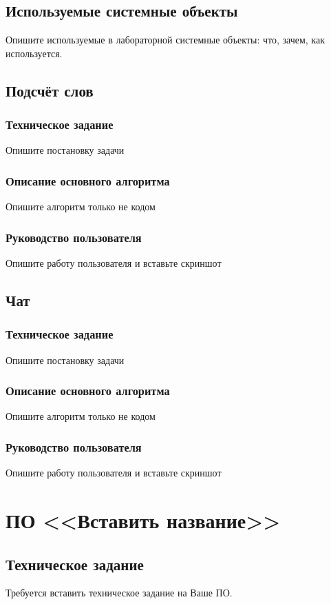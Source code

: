 \documentclass[a4paper,14pt]{extarticle}
\newcommand{\SOFTWARE}{Вставить название}
\begin{document}
\subsection{Используемые системные объекты}
Опишите используемые в лабораторной системные объекты: что, зачем, как используется.

\subsection{Подсчёт слов}
\subsubsection{Техническое задание}
Опишите постановку задачи

\subsubsection{Описание основного алгоритма}
Опишите алгоритм только не кодом

\subsubsection{Руководство пользователя}
Опишите работу пользователя и вставьте скриншот

\subsection{Чат}
\subsubsection{Техническое задание}
Опишите постановку задачи

\subsubsection{Описание основного алгоритма}
Опишите алгоритм только не кодом

\subsubsection{Руководство пользователя}
Опишите работу пользователя и вставьте скриншот
\newpage

\section{ПО <<\SOFTWARE>>}

\subsection{Техническое задание}
Требуется вставить техническое задание на Ваше ПО. 
\end{document}
